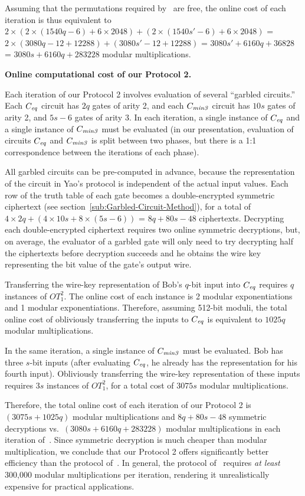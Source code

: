 Assuming that the permutations required by~\cite{atallah} are free,
the online cost of each iteration is thus equivalent to
$2 \times (2 \times (1540 q - 6) + 6 \times 2048) +
          (2 \times (1540 s' - 6) + 6 \times 2048)$ =
$2 \times (3080 q - 12 + 12288) +
          (3080 s' - 12 + 12288)$ =
$3080s' + 6160q + 36828$ =
$3080s + 6160q + 283228$ modular multiplications.

\vspace{1ex}
\noindent
\textbf{Online computational cost of our Protocol 2.}

Each iteration of our Protocol 2 involves evaluation of several ``garbled
circuits.''  Each $C_{\mathit{eq}}$ circuit has $2q$ gates of arity 2, and each
$C_{\mathit{min3}}$ circuit has $10s$ gates of arity 2, and $5s-6$ gates of arity 3.
In each iteration, a single instance of $C_{\mathit{eq}}$ and a single instance of
$C_{\mathit{min3}}$ must be evaluated (in our presentation, evaluation of circuits $C_{\mathit{eq}}$
and $C_{\mathit{min3}}$ is split between two phases, but there is a 1:1 correspondence
between the iterations of each phase).

All garbled circuits can be pre-computed in advance, because the
representation of the circuit in Yao's protocol is independent of the
actual input values.  Each row of the truth table of each gate becomes
a double-encrypted symmetric ciphertext (see section~\ref{sub:Garbled-Circuit-Method}), for
a total of $4 \times 2 q + (4 \times 10s +  8 \times (5s - 6))$ = $8q
+ 80s - 48$ ciphertexts.  Decrypting each double-encrypted ciphertext
requires two online symmetric decryptions, but, on average, the evaluator
of a garbled gate will only need to try decrypting half the ciphertexts
before decryption succeeds and he obtains the wire key representing the
bit value of the gate's output wire.

Transferring the wire-key representation of Bob's $q$-bit input into $C_{\mathit{eq}}$
requires $q$ instances of $OT_1^2$.  The online cost of each instance
is 2 modular exponentiations and 1 modular exponentiations.  Therefore,
assuming 512-bit moduli, the total online cost of obliviously transferring
the inputs to $C_{\mathit{eq}}$ is equivalent to $1025q$ modular multiplications.

In the same iteration, a single instance of $C_{\mathit{min3}}$ must be evaluated.
Bob has three $s$-bit inputs (after evaluating $C_{\mathit{eq}}$, he already has
the representation for his fourth input).  Obliviously transferring
the wire-key representation of these inputs requires $3s$ instances of
$OT_1^2$, for a total cost of $3075 s$ modular multiplications.

Therefore, the total online cost of each iteration of our Protocol
2 is $(3075 s + 1025 q)$ modular multiplications and $8q + 80s -
48$ symmetric decryptions vs.\ $(3080 s + 6160 q + 283228)$ modular
multiplications in each iteration of~\cite{atallah}.  Since symmetric
decryption is much cheaper than modular multiplication, we conclude
that our Protocol 2 offers significantly better efficiency than the
protocol of~\cite{atallah}.  In general, the protocol of~\cite{atallah}
requires \emph{at least} 300,000 modular multiplications per iteration,
rendering it unrealistically expensive for practical applications.

